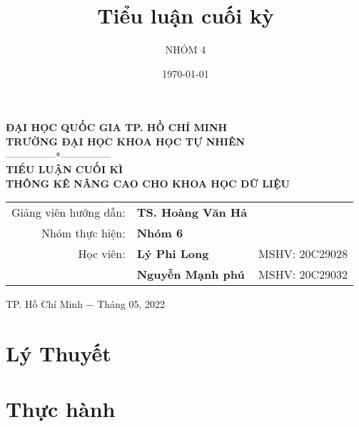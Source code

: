 \documentclass[a4paper]{book}
\title{Tiểu luận cuối kỳ}
\author{NHÓM 4}
\date{\today}%
\begin{document}
	
\begin{titlepage}
	\thispagestyle{empty}
	\begin{center}
		\textbf{\large{ĐẠI HỌC QUỐC GIA TP. HỒ CHÍ MINH\\TRƯỜNG ĐẠI HỌC KHOA HỌC TỰ NHIÊN}}\\
		---------------*---------------\\
		\vspace*{5.5cm}
		{\textcolor[rgb]{0.0,0.0,1.0}{\textbf{\Large{TIỂU LUẬN CUỐI KÌ}}}}\\
		\vspace{1cm}
		\textbf{\huge{\textcolor[rgb]{1.0,0.0,0.0}{THÔNG KÊ NÂNG CAO CHO KHOA HỌC DỮ LIỆU}}}\\
		\vspace*{4cm}
		\begin{tabular}{rll}
			{Giảng viên hướng dẫn:} &{\bf TS. Hoàng Văn Hả} &  \\
			{Nhóm thực hiện:}     & {\textbf{Nhóm 6}} & \\
			{Học viên:} & {\textbf{Lý Phi Long}} &{MSHV: 20C29028} \\
			& {\textbf{Nguyễn Mạnh phú}} &{MSHV: 20C29032}
		\end{tabular}
		\vfill
		\normalsize{TP. Hồ Chí Minh $-$ Tháng 05, 2022}
	\end{center}
\end{titlepage}

\tableofcontents

\newpage
\thispagestyle{empty}

\chapter{Lý Thuyết}





\chapter{Thực hành}


\end{document}
